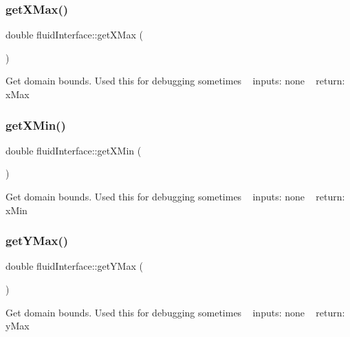 \mbox{\label{classfluidInterface_aed82e13bb4a6e9f3a2a10b446e14d936}} 
\subsubsection{\texorpdfstring{get\+X\+Max()}{getXMax()}}
{\footnotesize\ttfamily double fluid\+Interface\+::get\+X\+Max (\begin{DoxyParamCaption}{ }\end{DoxyParamCaption})}

Get domain bounds. Used this for debugging sometimes ~\newline
inputs\+: none ~\newline
return\+: x\+Max \mbox{\label{classfluidInterface_a34689031ca7a3f5be8a90ee90356f2b7}} 
\subsubsection{\texorpdfstring{get\+X\+Min()}{getXMin()}}
{\footnotesize\ttfamily double fluid\+Interface\+::get\+X\+Min (\begin{DoxyParamCaption}{ }\end{DoxyParamCaption})}

Get domain bounds. Used this for debugging sometimes ~\newline
inputs\+: none ~\newline
return\+: x\+Min \mbox{\label{classfluidInterface_a8032c45eaa5da27d5e58481b1712ea8a}} 
\subsubsection{\texorpdfstring{get\+Y\+Max()}{getYMax()}}
{\footnotesize\ttfamily double fluid\+Interface\+::get\+Y\+Max (\begin{DoxyParamCaption}{ }\end{DoxyParamCaption})}

Get domain bounds. Used this for debugging sometimes ~\newline
inputs\+: none ~\newline
return\+: y\+Max \mbox{\label{classfluidInterface_ae0f8e75e78e169a766fd51f30ef89d06}} 
